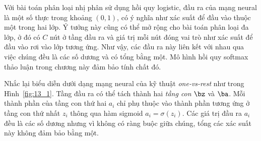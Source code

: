 Với bài toán phân loại nhị phân sử dụng hồi quy logistic, đầu ra của mạng neural
là một số thực trong khoảng $(0, 1)$, có ý nghĩa như xác suất để đầu vào thuộc
một trong hai lớp. Ý tưởng này cũng có thể mở rộng cho bài toán phân loại đa
lớp, ở đó có $C$ nút ở tầng đầu ra và giá trị mỗi nút đóng vai trò như xác
suất để đầu vào rơi vào lớp tương ứng. Như vậy, các đầu ra này liên kết với nhau
qua việc chúng đều là các số dương và có tổng bằng một. Mô hình hồi quy softmax
thảo luận trong chương này đảm bảo tính chất đó.

Nhắc lại biểu diễn dưới dạng mạng neural của kỹ thuật \textit{one-vs-rest} như
trong Hình~\ref{fig:13_1}. Tầng đầu ra có thể tách thành hai \textit{tầng con}
$\bz$ và $\ba$. Mỗi thành phần của tầng con thứ hai $a_i$ chỉ phụ thuộc vào
thành phần tương ứng ở tầng con thứ nhất $z_i$ thông qua hàm sigmoid $a_i =
\sigma(z_i)$. Các giá trị đầu ra $a_i$ đều là các số dương nhưng vì không có
ràng buộc giữa chúng, tổng các xác suất này không đảm bảo bằng một.




   
